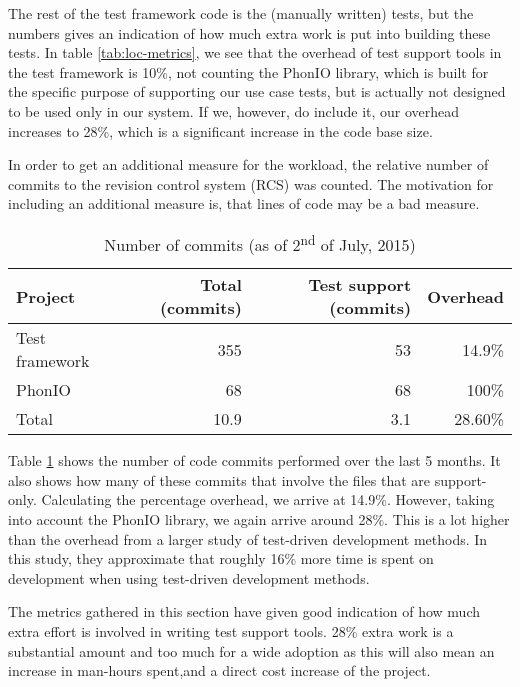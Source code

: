 \noindent The rest of the test framework code is the (manually written) tests, but the numbers gives an indication of how much extra work is put into building these tests. In table \ref{tab:loc-metrics}, we see that the overhead of test support tools in the test framework is 10\%, not counting the PhonIO library, which is built for the specific purpose of supporting our use case tests, but is actually not designed to be used only in our system. If we, however, do include it, our overhead increases to 28\%, which is a significant increase in the code base size.\medskip

\noindent In order to get an additional measure for the workload, the relative number of commits to the revision control system (RCS) was counted. The motivation for including an additional measure is, that lines of code may be a bad measure\cite{fraser2013does}.\medskip

\begin{table}[!htbp]
\centering
\begin{tabular}{ | l | r | r | r |}
   \hline
   Project        & Total (commits) & Test support (commits) & Overhead \\ \hline
   Test framework & 355             & 53                     & 14.9\%   \\
   PhonIO         & 68              & 68                     & 100\%    \\
   \hline
   Total          & 10.9            & 3.1                    & 28.60\%  \\
   \hline
   
\end{tabular}
\caption{Number of commits (as of 2\textsuperscript{nd} of July, 2015)}
\label{tab:metrics-commit-count}
\end{table}

\noindent Table \ref{tab:metrics-commit-count} shows the number of code commits performed over the last 5 months. It also shows how many of these commits that involve the files that are support-only. Calculating the percentage overhead, we arrive at 14.9\%. However, taking into account the PhonIO library, we again arrive around 28\%. This is a lot higher than the overhead from a larger study of test-driven development methods\cite{george2003}. In this study, they approximate that roughly 16\% more time is spent on development when using test-driven development methods.\bigskip

\noindent The metrics gathered in this section have given good indication of how much extra effort is involved in writing test support tools. 28\% extra work is a substantial amount and too much for a wide adoption as this will also mean an increase in man-hours spent,and a direct cost increase of the project.\medskip


